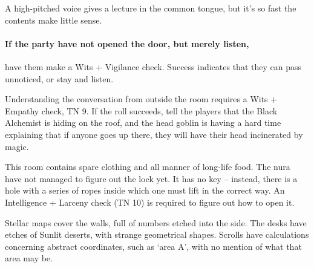 \begin{multicols}{2}



\begin{boxtext}

  A high-pitched voice gives a lecture in the common tongue, but it's so fast the contents make little sense.

\end{boxtext}

\paragraph{If the party have not opened the door, but merely listen,}
have them make a Wits + Vigilance check.
Success indicates that they can pass unnoticed, or stay and listen.

Understanding the conversation from outside the room requires a Wits + Empathy check, TN 9.
If the roll succeeds, tell the players that the Black Alchemist is hiding on the roof, and the head goblin is having a hard time explaining that if anyone goes up there, they will have their head incinerated by magic.

\goblinnuramancer



This room contains spare clothing and all manner of long-life food.
The nura have not managed to figure out the lock yet.
It has no key -- instead, there is a hole with a series of ropes inside which one must lift in the correct way.
An Intelligence + Larceny check (TN 10) is required to figure out how to open it.


\begin{boxtext}

  Stellar maps cover the walls, full of numbers etched into the side.
  The desks have etches of Sunlit deserts, with strange geometrical shapes.
  Scrolls have calculations concerning abstract coordinates, such as `area A', with no mention of what that area may be.

\end{boxtext}



\end{multicols}
